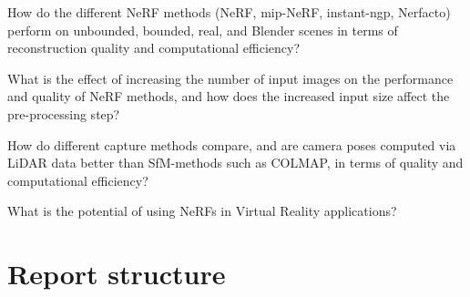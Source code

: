 
\begin{description}[leftmargin=!,labelwidth=\widthof{RQ 1:}]
\item[\textbf{RQ 1:}]
How do the different NeRF methods (NeRF, mip-NeRF, instant-ngp, Nerfacto) perform on unbounded, bounded, real, and Blender scenes in terms of reconstruction quality and computational efficiency?
\item[\textbf{RQ 2:}]
What is the effect of increasing the number of input images on the performance and quality of NeRF methods, and how does the increased input size affect the pre-processing step?
\item[\textbf{RQ 3:}]
How do different capture methods compare, and are camera poses computed via LiDAR data better than SfM-methods such as COLMAP, in terms of quality and computational efficiency?
\item[\textbf{RQ 4:}]
What is the potential of using NeRFs in Virtual Reality applications?
\end{description}


\section{Report structure}

